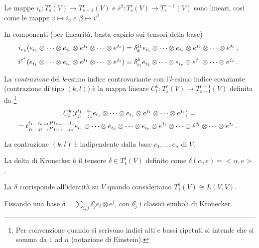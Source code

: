 \begin{remark}
	Le mappe $i_v:T_s^r(V)\to T_{s-1}^r(V)$ e $i^\beta:T_s^r(V)\to T_s^{r-1}(V)$ sono lineari, così come le mappe $v\mapsto i_v$ e $\beta\mapsto i^\beta$.
\end{remark}

In componenti (per linearità, basta capirlo sui tensori della base)
\begin{equation*}
	i_{e_k} (e_{i_1}\otimes \dots \otimes e_{i_r}\otimes e^{j_1}\otimes \dots\otimes e^{j_s}) = \delta_k^{j_1} e_{i_1}\otimes \dots \otimes e_{i_r}\otimes e^{j_2}\otimes \dots\otimes e^{j_s}\, \text{, }
\end{equation*}
\begin{equation*}
	i^{e^k} (e_{i_1}\otimes \dots \otimes e_{i_r}\otimes e^{j_1}\otimes \dots\otimes e^{j_s}) = \delta_{i_1}^k e_{i_2}\otimes \dots \otimes e_{i_r}\otimes e^{j_1}\otimes \dots\otimes e^{j_s}\, \text{. }
\end{equation*}

\begin{definition} 
	La \emph{contrazione} del $k$-esimo indice controvariante con l'$l$-esimo indice covariante (contrazione di tipo $(k,l)$) è la mappa lineare $C_l^k:T_s^r(V)\to T_{s-1}^{r-1}(V)$ definita da \footnote{ Per convenzione quando si scrivono indici alti e bassi ripetuti  si intende che si somma da $1$ ad $n$ (notazione di Einstein).}
	\begin{multline*}
		C_l^k(t_{j_1\dots j_s}^{i_1\dots i_r} e_{i_1}\otimes \dots \otimes e_{i_r}\otimes e^{j_1}\otimes \dots\otimes e^{j_s}) =\\
		=t_{j_1\dots j_{l-1}Pj_{l+1}\dots j_s}^{i_1\dots i_{k-1}Pi_{k+1}\dots i_r}e_{i_1}\otimes \dots \otimes\hat e_{i_k}\otimes \dots\otimes e_{i_r}\otimes e^{j_1}\otimes \dots\otimes \hat e^{j_l}\otimes \dots \otimes e^{j_s}\, \text{. }
	\end{multline*}
\end{definition}

\begin{remark}
	La contrazione $(k,l)$ è indipendente dalla base $e_1,\dots,e_n$ di $V$.
\end{remark}

\begin{definition}
	La delta di Kronecker è il tensore $\delta \in T_1^1(V)$ definito come $\delta(\alpha,e) = <\alpha,e>$.
\end{definition}

\begin{remark}
	La $\delta$ corrisponde all'identità su $V$ quando consideriamo $T_1^1(V) \cong L(V,V)$.
	
	Fissando una base $\delta = \sum_{i,j}\delta_j^i e_i\otimes e^j$, con $\delta_j^i$ i classici simboli di Kronecker.
\end{remark}

